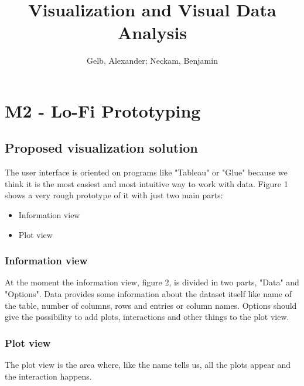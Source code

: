 \documentclass{article}
\begin{document}
\title{Visualization and Visual Data Analysis}
\author{Gelb, Alexander; Neckam, Benjamin}
\maketitle
\section{M2 - Lo-Fi Prototyping}
\subsection{Proposed visualization solution}
The user interface is oriented on programs like "Tableau" or "Glue" because we think it is the most easiest and most intuitive way to work with data. Figure 1 shows a very rough prototype of it with just two main parts:\\
\begin{itemize}
\item Information view
\item Plot view
\end{itemize}
\subsubsection{Information view}
At the moment the information view, figure 2, is divided in two parts, "Data" and "Options". Data provides some information about the dataset itself like name of the table, number of columns, rows and entries or column names. Options should give the possibility to add plots, interactions and other things to the plot view.
\subsubsection{Plot view}
The plot view is the area where, like the name tells us, all the plots appear and the interaction happens.
\end{document}
